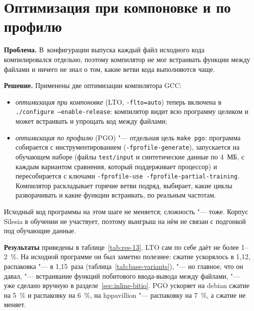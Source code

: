 
\section{Оптимизация при компоновке и по профилю}
\label{sec:lto-pgo}

\textbf{Проблема.} В~конфигурации выпуска каждый файл исходного кода
компилировался отдельно, поэтому компилятор не мог встраивать функции
между файлами и ничего не знал о том, какие ветви кода выполняются чаще.

\textbf{Решение.} Применены две оптимизации компилятора GCC:
\begin{itemize}
\item \emph{оптимизация при компоновке} (LTO, \texttt{-flto=auto}) теперь
включена в \texttt{./configure --enable-release}: компилятор видит всю
программу целиком и может встраивать и упрощать код между файлами;
\item \emph{оптимизация по профилю} (PGO) "--- отдельная цель
\texttt{make pgo}: программа собирается с инструментированием
(\texttt{-fprofile-generate}), запускается на обучающем наборе (файлы
\texttt{test/input} и синтетические данные по 4~МБ, с каждым вариантом
сравнения, который поддерживает процессор) и пересобирается с ключами
\texttt{-fprofile-use -fprofile-partial-training}. Компилятор раскладывает
горячие ветви подряд, выбирает, какие циклы разворачивать и какие функции
встраивать, по реальным частотам.
\end{itemize}
Исходный код программы на этом шаге не меняется; сложность "--- тоже.
Корпус Silesia в обучении не участвует, поэтому выигрыш на нём не связан с
подгонкой под обучающие данные.

\textbf{Результаты} приведены в таблице~\ref{tab:res-13}. LTO сам по себе
даёт не более 1--2~\%. На исходной программе он был заметно полезнее:
сжатие ускорялось в 1,12, распаковка "--- в 1,15~раза
(таблица~\ref{tab:base-variants}), "--- но главное, что он давал, "---
встраивание функций побитового ввода-вывода между файлами, "--- уже сделано
вручную в разделе~\ref{sec:inline-bitio}. PGO ускоряет на debian сжатие на 5~\% и распаковку на
6~\%, на hppavillion "--- распаковку на 7~\%, а сжатие не меняет.

